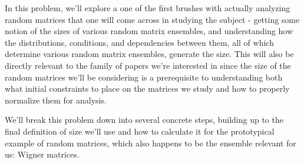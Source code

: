 \documentclass[a4paper]{article}
\begin{document}
In this problem, we'll explore a one of the first brushes with actually analyzing random matrices that one will come across in studying the subject - getting some notion of the sizes of various random matrix ensembles, and understanding how the distributions, conditions, and dependencies between them, all of which determine various random matrix ensembles, generate the size. This will also be directly relevant to the family of papers we're interested in since the size of the random matrices we'll be considering is a prerequisite to understanding both what initial constraints to place on the matrices we study and how to properly normalize them for analysis.

We'll break this problem down into several concrete steps, building up to the final definition of size we'll use and how to calculate it for the prototypical example of random matrices, which also happens to be the ensemble relevant for us: Wigner matrices.
\end{document}
